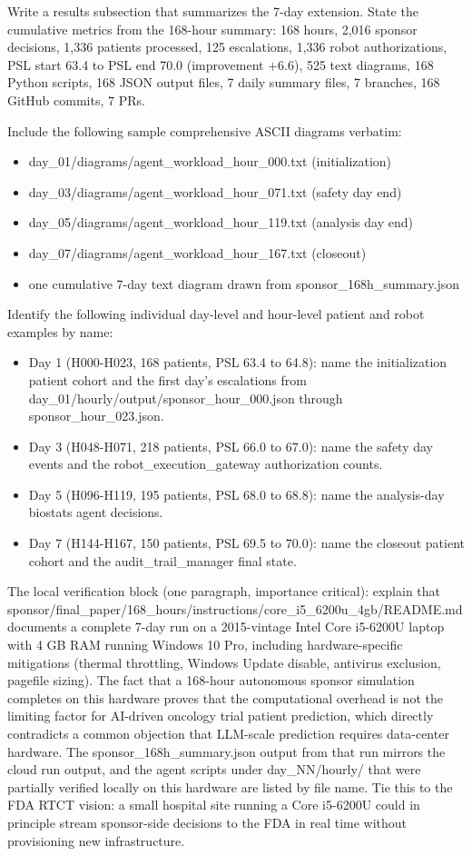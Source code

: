 Write a results subsection that summarizes the 7-day extension. State
the cumulative metrics from the 168-hour summary: 168 hours, 2,016
sponsor decisions, 1,336 patients processed, 125 escalations, 1,336 robot
authorizations, PSL start 63.4 to PSL end 70.0 (improvement +6.6), 525
text diagrams, 168 Python scripts, 168 JSON output files, 7 daily summary
files, 7 branches, 168 GitHub commits, 7 PRs.

Include the following sample comprehensive ASCII diagrams verbatim:
\begin{itemize}[leftmargin=*]
\item day\_01/diagrams/agent\_workload\_hour\_000.txt (initialization)
\item day\_03/diagrams/agent\_workload\_hour\_071.txt (safety day end)
\item day\_05/diagrams/agent\_workload\_hour\_119.txt (analysis day end)
\item day\_07/diagrams/agent\_workload\_hour\_167.txt (closeout)
\item one cumulative 7-day text diagram drawn from
sponsor\_168h\_summary.json
\end{itemize}

Identify the following individual day-level and hour-level patient and
robot examples by name:
\begin{itemize}[leftmargin=*]
\item Day 1 (H000-H023, 168 patients, PSL 63.4 to 64.8): name the
initialization patient cohort and the first day's escalations from
day\_01/hourly/output/sponsor\_hour\_000.json through
sponsor\_hour\_023.json.
\item Day 3 (H048-H071, 218 patients, PSL 66.0 to 67.0): name the safety
day events and the robot\_execution\_gateway authorization counts.
\item Day 5 (H096-H119, 195 patients, PSL 68.0 to 68.8): name the
analysis-day biostats agent decisions.
\item Day 7 (H144-H167, 150 patients, PSL 69.5 to 70.0): name the
closeout patient cohort and the audit\_trail\_manager final state.
\end{itemize}

The local verification block (one paragraph, importance critical):
explain that
sponsor/final\_paper/168\_hours/instructions/core\_i5\_6200u\_4gb/README.md
documents a complete 7-day run on a 2015-vintage Intel Core i5-6200U
laptop with 4 GB RAM running Windows 10 Pro, including hardware-specific
mitigations (thermal throttling, Windows Update disable, antivirus
exclusion, pagefile sizing). The fact that a 168-hour autonomous sponsor
simulation completes on this hardware proves that the computational
overhead is not the limiting factor for AI-driven oncology trial patient
prediction, which directly contradicts a common objection that LLM-scale
prediction requires data-center hardware. The sponsor\_168h\_summary.json
output from that run mirrors the cloud run output, and the agent scripts
under day\_NN/hourly/ that were partially verified locally on this
hardware are listed by file name. Tie this to the FDA RTCT vision: a
small hospital site running a Core i5-6200U could in principle stream
sponsor-side decisions to the FDA in real time without provisioning new
infrastructure.

